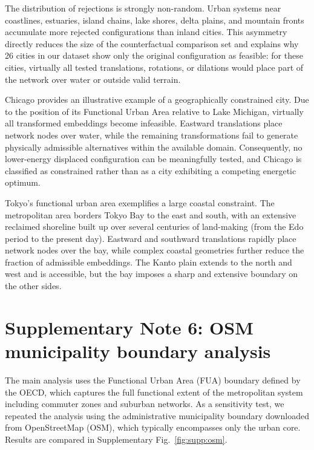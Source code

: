 \documentclass[11pt]{article}
\begin{document}
The distribution of rejections is strongly non-random. Urban systems near coastlines, estuaries, island chains, lake shores, delta plains, and mountain fronts accumulate more rejected configurations than inland cities. This asymmetry directly reduces the size of the counterfactual comparison set and explains why 26 cities in our dataset show only the original configuration as feasible: for these cities, virtually all tested translations, rotations, or dilations would place part of the network over water or outside valid terrain.

Chicago provides an illustrative example of a geographically constrained city. Due to the position of its Functional Urban Area relative to Lake Michigan, virtually all transformed embeddings become infeasible. Eastward translations place network nodes over water, while the remaining transformations fail to generate physically admissible alternatives within the available domain. Consequently, no lower-energy displaced configuration can be meaningfully tested, and Chicago is classified as constrained rather than as a city exhibiting a competing energetic optimum.

Tokyo's functional urban area exemplifies a large coastal constraint. The metropolitan area borders Tokyo Bay to the east and south, with an extensive reclaimed shoreline built up over several centuries of land-making (from the Edo period to the present day). Eastward and southward translations rapidly place network nodes over the bay, while complex coastal geometries further reduce the fraction of admissible embeddings. The Kanto plain extends to the north and west and is accessible, but the bay imposes a sharp and extensive boundary on the other sides.

\section*{Supplementary Note 6: OSM municipality boundary analysis}
\label{sec:osm}

The main analysis uses the Functional Urban Area (FUA) boundary defined by the OECD, which captures the full functional extent of the metropolitan system including commuter zones and suburban networks. As a sensitivity test, we repeated the analysis using the administrative municipality boundary downloaded from OpenStreetMap (OSM), which typically encompasses only the urban core. Results are compared in Supplementary Fig.~\ref{fig:supp:osm}.
\end{document}
